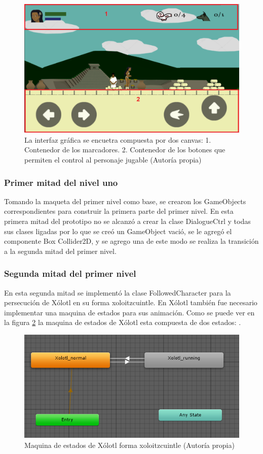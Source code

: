 \begin{figure}
  \centering
   \includegraphics[width=0.4 \textwidth]{05TrabajoRealizado/03Unity/imagenes/03Interfaz}
  \caption{La interfaz gráfica se encuetra compuesta por dos canvas: 1. Contenedor de los marcadores. 2. Contenedor de los botones que permiten el control al personaje jugable (Autoría propia)}
  \label{figCanvasM}
\end{figure}

\subsubsection{Primer mitad del nivel uno}
Tomando la maqueta del primer nivel como base, se crearon los GameObjects 
correspondientes para construir la primera parte del primer nivel. 
 En esta primera mitad del prototipo no se alcanzó a crear la clase DialogueCtrl y todas sus clases ligadas por lo que se creó un GameObject vació, se le agregó el componente Box Collider2D, y se agrego una  de este modo se realiza la transición a la segunda mitad del primer nivel.
 
 \subsubsection{Segunda mitad del primer nivel}
 En esta segunda mitad se implementó la clase FollowedCharacter para la persecución 
 de Xólotl en su forma xoloitzcuintle. En Xólotl también fue necesario implementar 
 una maquina de estados para sus animación. Como se puede ver en la figura \ref{figAniXolo} la  maquina de estados de Xólotl esta compuesta de dos estados: .
 
 \begin{figure}
  \centering
   \includegraphics[width=0.4 \textwidth]{05TrabajoRealizado/03Unity/imagenes/03MaquinaEstadosXolotl}
  \caption{Maquina de estados de Xólotl forma xoloitzcuintle (Autoría propia)}
  \label{figAniXolo}
\end{figure}